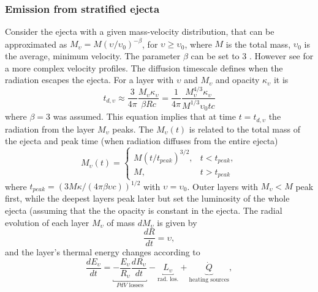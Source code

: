 \subsubsection{Emission from stratified ejecta}

%
Consider the ejecta with a given mass-velocity distribution, that can be approximated as 
$M_{\upsilon} = M(\upsilon / \upsilon_0)^{-\beta}$, for $\upsilon \geq \upsilon_0$,
where $M$ is the total mass, $\upsilon_0$ is the average, minimum velocity. 
The parameter $\beta$ can be set to $3$ \citep{Bauswein:2013yna}. %
However see \citet{Piran:2012wd}%
for a more complex velocity profiles.
%
%
The diffusion timescale defines when the radiation escapes the ejecta. For a layer with 
$\upsilon$ and $M_{\upsilon}$ and opacity $\kappa_{\upsilon}$ it is 
%
\begin{equation}
t_{d,\upsilon} \approx \frac{3}{4\pi}\frac{M_{\upsilon}\kappa_{\upsilon}}{\beta Rc} = 
\frac{1}{4\pi}\frac{M_{\upsilon}^{4/3}\kappa_{\upsilon}}{M^{1/3}\upsilon_0 t c}
\end{equation}
%
where $\beta=3$ was assumed. 
%
This equation implies that at time $t=t_{d,\upsilon}$ the radiation from the layer $M_{\upsilon}$ 
peaks.
%
The $M_{\upsilon}(t)$ is related to the total mass of the ejecta and 
peak time (when radiation diffuses from the entire ejecta)
%
\begin{equation}
M_{\upsilon}(t) = 
\begin{cases}
M(t/t_{peak})^{3/2},& t<t_{peak}, \\
M, &t>t_{peak}
\end{cases}
\end{equation}
%
where $t_{peak} = (3M\kappa / (4\pi \beta \upsilon c))^{1/2}$ with 
$\upsilon = \upsilon_0$. 
%
Outer layers with $M_{\upsilon} < M$ peak first, while the deepest layers peak later but set the 
luminosity of the whole ejecta (assuming that the the opacity is constant in the ejecta. 
%
The radial evolution of each layer $M_{\upsilon}$ of mass $dM_{\upsilon}$ is given by 
%
\begin{equation}
\frac{dR}{dt} = \upsilon,
\end{equation}
%
and the layer's thermal energy changes according to 
%
\begin{equation}
\label{eq:theory:mkn:energ}
\frac{dE_{\upsilon}}{dt} = \underbracket{-\frac{E_{\upsilon}}{R_{\upsilon}} \frac{dR_{\upsilon}}{dt}}_{PdV\text{ losses}} - 
\underbracket{L_{\upsilon}}_{\text{rad. los.}} + \underbrace{\dot{Q}}_{\text{heating sources}},
\end{equation}
